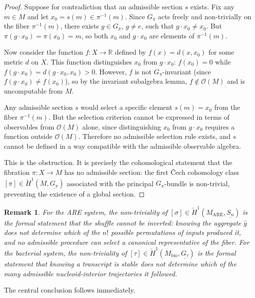 \documentclass[12pt, a4paper]{article}
\theoremstyle{essaystyle}
\newtheorem*{remark}{Remark}
\begin{document}
\begin{proof}
Suppose for contradiction that an admissible section $s$ exists. Fix any $m \in M$ and
let $x_0 = s(m) \in \pi^{-1}(m)$. Since $G_\pi$ acts freely and non-trivially on the
fiber $\pi^{-1}(m)$, there exists $g \in G_\pi$, $g \neq e$, such that $g \cdot x_0
\neq x_0$. But $\pi(g \cdot x_0) = \pi(x_0) = m$, so both $x_0$ and $g \cdot x_0$ are
elements of $\pi^{-1}(m)$.

Now consider the function $f : X \to \mathbb{R}$ defined by $f(x) = d(x, x_0)$ for some
metric $d$ on $X$. This function distinguishes $x_0$ from $g \cdot x_0$: $f(x_0) = 0$
while $f(g \cdot x_0) = d(g \cdot x_0, x_0) > 0$. However, $f$ is not $G_\pi$-invariant
(since $f(g \cdot x_0) \neq f(x_0)$), so by the invariant subalgebra lemma, $f \notin
\mathcal{O}(M)$ and is uncomputable from $M$.

Any admissible section $s$ would select a specific element $s(m) = x_0$ from the fiber
$\pi^{-1}(m)$. But the selection criterion cannot be expressed in terms of observables
from $\mathcal{O}(M)$ alone, since distinguishing $x_0$ from $g \cdot x_0$ requires a
function outside $\mathcal{O}(M)$. Therefore no admissible selection rule exists, and
$s$ cannot be defined in a way compatible with the admissible observable algebra.

This is the obstruction. It is precisely the cohomological statement that the fibration
$\pi : X \to M$ has no admissible section: the first Čech cohomology class
$[\pi] \in \check{H}^1(M, \underline{G_\pi})$ associated with the principal
$G_\pi$-bundle is non-trivial, preventing the existence of a global section.
\end{proof}

\begin{remark}
For the ARE system, the non-triviality of $[\sigma] \in \check{H}^1(M_{\mathrm{ARE}},
\underline{S_n})$ is the formal statement that the shuffle cannot be inverted: knowing
the aggregate $\hat{y}$ does not determine which of the $n!$ possible permutations of
inputs produced it, and no admissible procedure can select a canonical representative
of the fiber. For the bacterial system, the non-triviality of $[\tau] \in
\check{H}^1(M_{\mathrm{bio}}, \underline{G_\tau})$ is the formal statement that
knowing a transcript is stable does not determine which of the many admissible
nucleoid-interior trajectories it followed.
\end{remark}

The central conclusion follows immediately.
\end{document}
